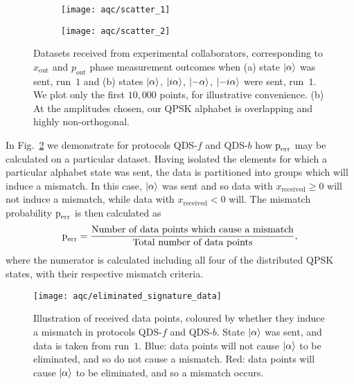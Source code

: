 \begin{figure}[htp]
\captionsetup{width=0.8\linewidth}
\centering
	\begin{subfigure}{0.49\linewidth}
	\centering
	\texttt{[image: aqc/scatter\_1]}
	\caption{}
	\end{subfigure}
	\begin{subfigure}{0.49\linewidth}
	\centering
	\texttt{[image: aqc/scatter\_2]}
	\end{subfigure}
\caption{\label{fig:aqc_scatter} Datasets received from experimental collaborators, corresponding to $x_{\text{out}}$ and $p_{\text{out}}$ phase measurement outcomes when (a) state $\ket{\alpha}$ was sent, run~$1$ and (b) states $\ket{\alpha}$, $\ket{i \alpha}$, $\ket{- \alpha}$, $\ket{- i \alpha}$ were sent, run~$1$. We plot only the first $10,000$ points, for illustrative convenience. (b) At the amplitudes chosen, our QPSK alphabet is overlapping and highly non-orthogonal.}
\end{figure}

In Fig.~\ref{fig:aqc_elimsig} we demonstrate for protocols QDS-$f$ and QDS-$b$ how $\text{p}_{\text{err}}$ may be calculated on a particular dataset. Having isolated the elements for which a particular alphabet state was sent, the data is partitioned into groups which will induce a mismatch. In this case, $\ket{\alpha}$ was sent and so data with $x_{\text{received}} \ge 0$ will not induce a mismatch, while data with $x_{\text{received}}<0$ will. The mismatch probability $\text{p}_{\text{err}}$ is then calculated as
\begin{equation}\label{eqn:aqc_data_perr}
\text{p}_{\text{err}} = \frac{\text{Number of data points which cause a mismatch}}{\text{Total number of data points}},
\end{equation}
where the numerator is calculated including all four of the distributed QPSK states, with their respective mismatch criteria.

\begin{figure}[htp]
\captionsetup{width=0.8\linewidth}
\centering
\texttt{[image: aqc/eliminated\_signature\_data]}
\caption{\label{fig:aqc_elimsig} Illustration of received data points, coloured by whether they induce a mismatch in protocols QDS-$f$ and QDS-$b$. State $\ket{\alpha}$ was sent, and data is taken from run~$1$. Blue: data points will not cause $\ket{\alpha}$ to be eliminated, and so do not cause a mismatch. Red: data points will cause $\ket{\alpha}$ to be eliminated, and so a mismatch occurs. }
\end{figure}

